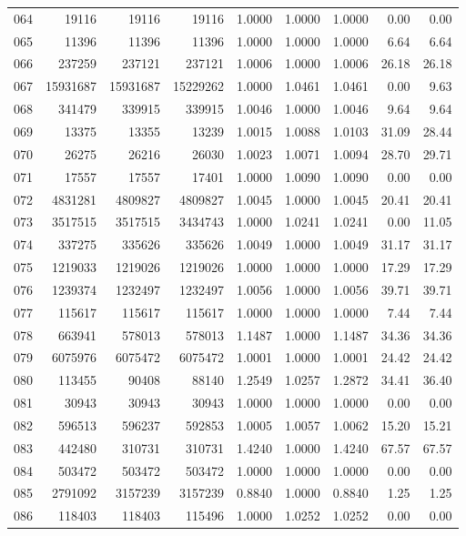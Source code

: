 \begin{longtable}{crrrrrrrr}
064 & 19116 & 19116 & 19116 & 1.0000 & 1.0000 & 1.0000 & 0.00 & 0.00 \\
065 & 11396 & 11396 & 11396 & 1.0000 & 1.0000 & 1.0000 & 6.64 & 6.64 \\
066 & 237259 & 237121 & 237121 & 1.0006 & 1.0000 & 1.0006 & 26.18 & 26.18 \\
067 & 15931687 & 15931687 & 15229262 & 1.0000 & 1.0461 & 1.0461 & 0.00 & 9.63 \\
068 & 341479 & 339915 & 339915 & 1.0046 & 1.0000 & 1.0046 & 9.64 & 9.64 \\
069 & 13375 & 13355 & 13239 & 1.0015 & 1.0088 & 1.0103 & 31.09 & 28.44 \\
070 & 26275 & 26216 & 26030 & 1.0023 & 1.0071 & 1.0094 & 28.70 & 29.71 \\
071 & 17557 & 17557 & 17401 & 1.0000 & 1.0090 & 1.0090 & 0.00 & 0.00 \\
072 & 4831281 & 4809827 & 4809827 & 1.0045 & 1.0000 & 1.0045 & 20.41 & 20.41 \\
073 & 3517515 & 3517515 & 3434743 & 1.0000 & 1.0241 & 1.0241 & 0.00 & 11.05 \\
074 & 337275 & 335626 & 335626 & 1.0049 & 1.0000 & 1.0049 & 31.17 & 31.17 \\
075 & 1219033 & 1219026 & 1219026 & 1.0000 & 1.0000 & 1.0000 & 17.29 & 17.29 \\
076 & 1239374 & 1232497 & 1232497 & 1.0056 & 1.0000 & 1.0056 & 39.71 & 39.71 \\
077 & 115617 & 115617 & 115617 & 1.0000 & 1.0000 & 1.0000 & 7.44 & 7.44 \\
078 & 663941 & 578013 & 578013 & 1.1487 & 1.0000 & 1.1487 & 34.36 & 34.36 \\
079 & 6075976 & 6075472 & 6075472 & 1.0001 & 1.0000 & 1.0001 & 24.42 & 24.42 \\
080 & 113455 & 90408 & 88140 & 1.2549 & 1.0257 & 1.2872 & 34.41 & 36.40 \\
081 & 30943 & 30943 & 30943 & 1.0000 & 1.0000 & 1.0000 & 0.00 & 0.00 \\
082 & 596513 & 596237 & 592853 & 1.0005 & 1.0057 & 1.0062 & 15.20 & 15.21 \\
083 & 442480 & 310731 & 310731 & 1.4240 & 1.0000 & 1.4240 & 67.57 & 67.57 \\
084 & 503472 & 503472 & 503472 & 1.0000 & 1.0000 & 1.0000 & 0.00 & 0.00 \\
085 & 2791092 & 3157239 & 3157239 & 0.8840 & 1.0000 & 0.8840 & 1.25 & 1.25 \\
086 & 118403 & 118403 & 115496 & 1.0000 & 1.0252 & 1.0252 & 0.00 & 0.00 \\

\end{longtable}
